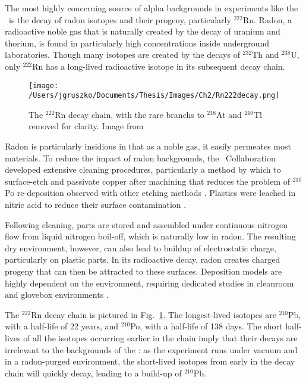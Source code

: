 The most highly concerning source of alpha backgrounds in experiments like the \DEM\ is the decay of radon isotopes and their progeny, particularly $^{222}$Rn. Radon, a radioactive noble gas that is naturally created by the decay of uranium and thorium, is found in particularly high concentrations inside underground laboratories. Though many isotopes are created by the decays of $^{232}$Th and $^{238}$U, only $^{222}$Rn has a long-lived radioactive isotope in its subsequent decay chain. 

\begin{figure}[t]
 \centering
 \texttt{[image: /Users/jgruszko/Documents/Thesis/Images/Ch2/Rn222decay.png]}
 \caption[The $^{222}$Rn decay chain]{The $^{222}$Rn decay chain, with the rare branchs to $^{218}$At and $^{210}$Tl removed for clarity. Image from \cite{Guiseppe2011}} 
 \label{fig:Rn222}
\end{figure}

Radon is particularly insidious in that as a noble gas, it easily permeates most materials. To reduce the impact of radon backgrounds, the \MJ\ Collaboration developed extensive cleaning procedures, particularly a method by which to surface-etch and passivate copper after machining \cite{Hoppe2007} that reduces the problem of $^{210}$Po re-deposition observed with other etching methods \cite{Zuzel2012}. Plastics were leached in nitric acid to reduce their surface contamination \cite{Overman2013}. 

Following cleaning, parts are stored and assembled under continuous nitrogen flow from liquid nitrogen boil-off, which is naturally low in radon. The resulting dry environment, however, can also lead to buildup of electrostatic charge, particularly on plastic parts. In its radioactive decay, radon creates charged progeny that can then be attracted to these surfaces. Deposition models are highly dependent on the environment, requiring dedicated studies in cleanroom and glovebox environments \cite{Guiseppe2011}. 

The $^{222}$Rn decay chain is pictured in Fig.~\ref{fig:Rn222}. The longest-lived isotopes are $^{210}$Pb, with a half-life of 22 years, and $^{210}$Po, with a half-life of 138 days. The short half-lives of all the isotopes occurring earlier in the chain imply that their decays are irrelevant to the backgrounds of the \DEM : as the experiment runs under vacuum and in a radon-purged environment, the short-lived isotopes from early in the decay chain will quickly decay, leading to a build-up of $^{210}$Pb. 

